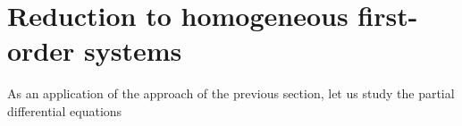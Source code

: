 \documentclass{birkjour}
\theoremstyle{definition}
\theoremstyle{remark}
\numberwithin{equation}{section}
\numberwithin{equation}{section}
\numberwithin{thm}{section}
\numberwithin{equation}{section}
\numberwithin{thm}{section}
\begin{document}
\section{Reduction to homogeneous first-order systems}\label{Se:ApplIn}
As an application of the approach of the previous section, let us study the partial differential equations
\end{document}
